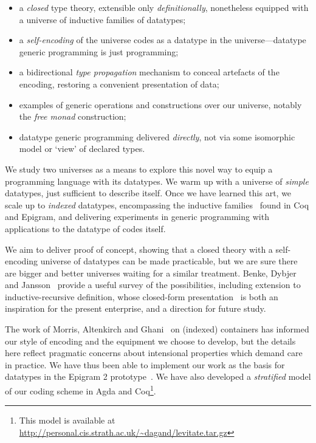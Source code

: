 \documentclass[authoryear]{sigplanconf}
\begin{document}
\begin{itemize}
\item a \emph{closed} type theory, extensible only \emph{definitionally},
  nonetheless equipped with a universe of inductive families of datatypes;
\item a \emph{self-encoding} of the universe codes as a datatype in the
  universe---datatype generic programming is just programming;
\item a bidirectional \emph{type propagation} mechanism to conceal
  artefacts of the encoding, restoring
  a convenient presentation of data;
\item examples of generic operations and constructions over our universe,
  notably the \emph{free monad} construction;
\item datatype generic programming delivered \emph{directly},
  not via some isomorphic
  model or `view' of declared types.
\end{itemize}

We study two universes as a means to explore this novel way to equip a
programming language with its datatypes. We warm up with a universe of
\emph{simple} datatypes, just sufficient to describe itself. Once we
have learned this art, we scale up to \emph{indexed} datatypes,
encompassing the inductive families~\cite{dybjer:families,luo:utt}
found in Coq and Epigram, and delivering experiments in generic
programming with applications to the datatype of codes itself.

We aim to deliver proof of concept, showing that a closed theory with
a self-encoding universe of datatypes can be made practicable, but we
are sure there are bigger and better universes waiting for a similar
treatment. Benke, Dybjer and
Jansson~\cite{benke:universe-generic-prog} provide a useful survey of
the possibilities, including extension to inductive-recursive
definition, whose closed-form presentation~\cite{dybjer:axiom-ir,
  dybjer:ir-initial-algebra} is both an inspiration for the present
enterprise, and a direction for future study.

The work of Morris, Altenkirch and
Ghani~\cite{morris:PhD,morris:spf,alti:lics09} on
(indexed) containers has informed our style of encoding and the
equipment we choose to develop, but the details here reflect pragmatic
concerns about intensional properties which demand care in
practice. We have thus been able to implement our work as the basis
for datatypes in the Epigram 2 prototype~\cite{pigs:epigram}. We
have also developed a \emph{stratified} model of our coding scheme
in Agda and Coq\footnote{This model is available at \\
\url{http://personal.cis.strath.ac.uk/~dagand/levitate.tar.gz}}.
\end{document}
